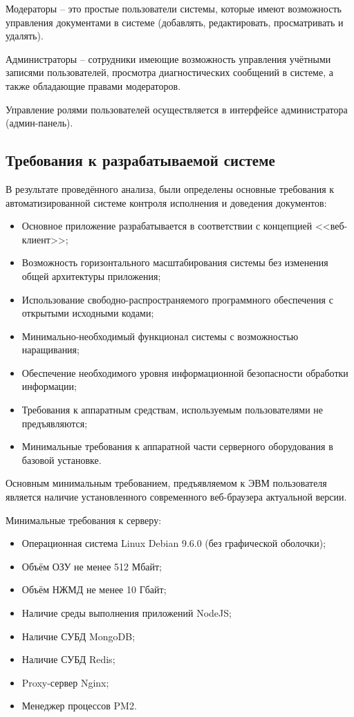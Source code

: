\documentclass[russian]{eskdtext}
\begin{document}
Модераторы -- это простые пользователи системы, которые имеют возможность управления документами в системе (добавлять, редактировать, просматривать и удалять).

Администраторы -- сотрудники имеющие возможность управления учётными записями пользователей, просмотра диагностических сообщений в системе, а также обладающие правами модераторов.

Управление ролями пользователей осуществляется в интерфейсе администратора (админ-панель).

\subsection{Требования к разрабатываемой системе}
В результате проведённого анализа, были определены основные требования к автоматизированной системе контроля исполнения и доведения документов:
\begin{itemize}
	\item Основное приложение разрабатывается в соответствии с концепцией <<веб-клиент>>;
	\item Возможность горизонтального масштабирования системы без изменения общей архитектуры приложения;
	\item Использование свободно-распространяемого программного обеспечения с открытыми исходными кодами;
	\item Минимально-необходимый функционал системы с возможностью наращивания;
	\item Обеспечение необходимого уровня информационной безопасности обработки информации;
	\item Требования к аппаратным средствам, используемым пользователями не предъявляются;
	\item Минимальные требования к аппаратной части серверного оборудования в базовой установке.
\end{itemize}

Основным минимальным требованием, предъявляемом к ЭВМ пользователя является наличие  установленного современного веб-браузера актуальной версии.

Минимальные требования к серверу:
\begin{itemize}
	\item Операционная система Linux Debian 9.6.0 (без графической оболочки);
	\item Объём ОЗУ не менее 512 Мбайт;
	\item Объём НЖМД не менее 10 Гбайт;
	\item Наличие среды выполнения приложений NodeJS;
	\item Наличие СУБД MongoDB;
	\item Наличие СУБД Redis;
	\item Proxy-сервер Nginx;
	\item Менеджер процессов PM2.
\end{itemize}
\end{document}
